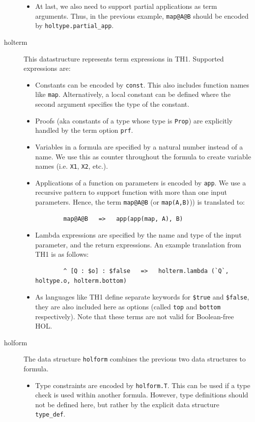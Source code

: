 \documentclass[a4paper]{article}
\begin{document}
\begin{description}
\begin{itemize}
		\item At last, we also need to support partial applications as term arguments. Thus, in the previous example, \texttt{map@A@B} should be encoded by \texttt{holtype.partial\_app}.
	\end{itemize}
	\item[holterm] This datastructure represents term expressions in TH1. Supported expressions are:
	\begin{itemize}
		\item Constants can be encoded by \texttt{const}. This also includes function names like \texttt{map}. Alternatively, a local constant can be defined where the second argument specifies the type of the constant.
		\item Proofs (aka constants of a type whose type is \texttt{Prop}) are explicitly handled by the term option \texttt{prf}.
		\item Variables in a formula are specified by a natural number instead of a name. We use this as counter throughout the formula to create variable names (i.e. \texttt{X1}, \texttt{X2}, etc.).
		\item Applications of a function on parameters is encoded by \texttt{app}. We use a recursive pattern to support function with more than one input parameters. Hence, the term \texttt{map@A@B} (or \texttt{map(A,B)})) is translated to:
		\begin{verbatim}
		map@A@B   =>   app(app(map, A), B)
		\end{verbatim}
		\item Lambda expressions are specified by the name and type of the input parameter, and the return expressions. An example translation from TH1 is as follows:
		\begin{verbatim}
		^ [Q : $o] : $false   =>   holterm.lambda (`Q`, holtype.o, holterm.bottom)
		\end{verbatim}
		\item As languages like TH1 define separate keywords for \texttt{\$true} and \texttt{\$false}, they are also included here as options (called \texttt{top} and \texttt{bottom} respectively). Note that these terms are not valid for Boolean-free HOL. 
	\end{itemize}
	\item[holform] The data structure \texttt{holform} combines the previous two data structures to formula. 
	\begin{itemize}
		\item Type constraints are encoded by \texttt{holform.T}. This can be used if a type check is used within another formula. However, type definitions should not be defined here, but rather by the explicit data structure \texttt{type\_def}.

\end{itemize}
\end{description}
\end{document}
